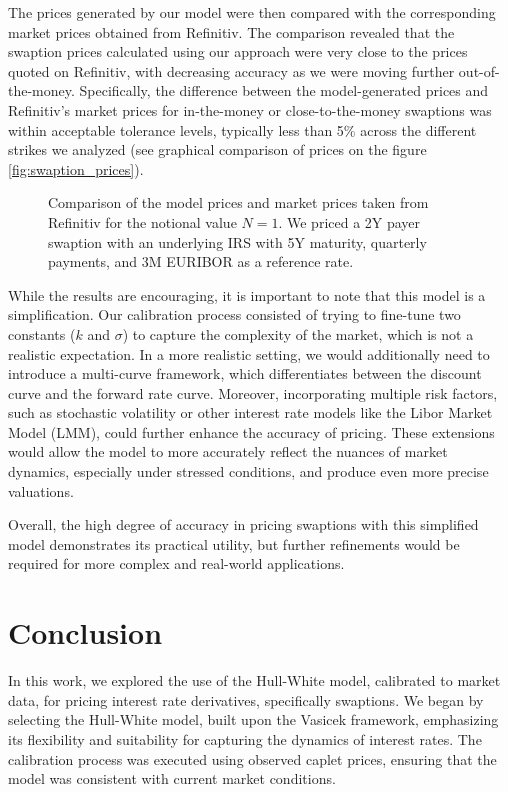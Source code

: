 \documentclass[titlepage, 12pt]{article}
\begin{document}
	The prices generated by our model were then compared with the corresponding market prices obtained from Refinitiv. The comparison revealed that the swaption prices calculated using our approach were very close to the prices quoted on Refinitiv, with decreasing accuracy as we were moving further out-of-the-money. Specifically, the difference between the model-generated prices and Refinitiv's market prices for in-the-money or close-to-the-money swaptions was within acceptable tolerance levels, typically less than 5\% across the different strikes we analyzed (see graphical comparison of prices on the figure \ref{fig:swaption_prices}).
	
	\begin{figure}[H]\label{fig:swaption_prices}
		\centering
		
		\caption{Comparison of the model prices and market prices taken from Refinitiv for the notional value $N=1$. We priced a 2Y payer swaption with an underlying IRS with 5Y maturity, quarterly payments, and 3M EURIBOR as a reference rate.}	\label{fig:swaption_price_comparison}
	\end{figure}
	
	While the results are encouraging, it is important to note that this model is a simplification. Our calibration process consisted of trying to fine-tune two constants ($k$ and $\sigma$) to capture the complexity of the market, which is not a realistic expectation. In a more realistic setting, we would additionally need to introduce a multi-curve framework, which differentiates between the discount curve and the forward rate curve. Moreover, incorporating multiple risk factors, such as stochastic volatility or other interest rate models like the Libor Market Model (LMM), could further enhance the accuracy of pricing. These extensions would allow the model to more accurately reflect the nuances of market dynamics, especially under stressed conditions, and produce even more precise valuations.
	
	Overall, the high degree of accuracy in pricing swaptions with this simplified model demonstrates its practical utility, but further refinements would be required for more complex and real-world applications.
	
	\newpage
	\section{Conclusion}\label{conclusion}
	
	In this work, we explored the use of the Hull-White model, calibrated to market data, for pricing interest rate derivatives, specifically swaptions. We began by selecting the Hull-White model, built upon the Vasicek framework, emphasizing its flexibility and suitability for capturing the dynamics of interest rates. The calibration process was executed using observed caplet prices, ensuring that the model was consistent with current market conditions.
	
\end{document}
